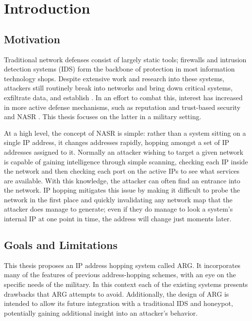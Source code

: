 \chapter{Introduction}
\label{chp:introduction}

\section{Motivation}
\par Traditional network defenses consist of largely static tools; firewalls and intrusion detection systems (IDS) form the backbone of protection in most information technology shops. Despite extensive work and research into these systems, attackers still routinely break into networks and bring down critical systems, exfiltrate data, and establish . In an effort to combat this, interest has increased in more active defense mechanisms, such as reputation and trust-based security \cite{Untrustworthiness} and \ac{NASR} \cite{APOD, NAH}. This thesis focuses on the latter in a military setting.

\par At a high level, the concept of NASR is simple: rather than a system sitting on a single \ac{IP} address, it changes addresses rapidly, hopping amongst a set of \ac{IP} addresses assigned to it. Normally an attacker wishing to target a given network is capable of gaining intelligence through simple scanning, checking each IP inside the network and then checking each port on the active IPs to see what services are available. With this knowledge, the attacker can often find an entrance into the network. IP hopping mitigates this issue by making it difficult to probe the network in the first place and quickly invalidating any network map that the attacker does manage to generate; even if they do manage to look a system's internal IP at one point in time, the address will change just moments later.

\section{Goals and Limitations}
\par This thesis proposes an IP address hopping system called \ac{ARG}. It incorporates many of the features of previous address-hopping schemes, with an eye on the specific needs of the military. In this context each of the existing systems presents drawbacks that \ac{ARG} attempts to avoid. Additionally, the design of ARG is intended to allow its future integration with a traditional IDS and honeypot, potentially gaining additional insight into an attacker's behavior.

